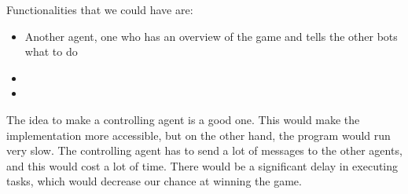 Functionalities that we could have are:
\begin{itemize}
	\item Another agent, one who has an overview of the game and tells the other bots what to do
	\item 
	\item 
\end{itemize}
The idea to make a controlling agent is a good one. This would make the implementation more accessible, but on the other hand, the program would run very slow. The controlling agent has to send a lot of messages to the other agents, and this would cost a lot of time. There would be a significant delay in executing tasks, which would decrease our chance at winning the game.\\


